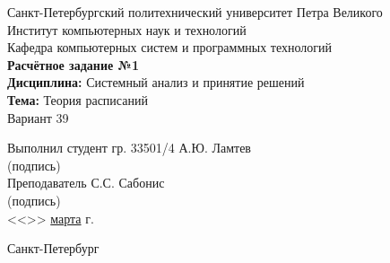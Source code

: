 \begin{titlepage}
\begin{center}
	Санкт-Петербургский политехнический университет Петра Великого\\[0.3cm]
	Институт компьютерных наук и технологий \\[0.3cm]
	Кафедра компьютерных систем и программных технологий\\[4cm]
	
	\textbf{Расчётное задание №1}\\[2mm]
	\textbf{Дисциплина:} Системный анализ и принятие решений\\[2mm]
	\textbf{Тема:} Теория расписаний\\[2mm]
	Вариант 39\\[6.5cm]
\end{center}

\begin{flushleft}
	\hspace*{5mm} Выполнил студент гр. 33501/4  \hspace*{3cm}\sign[3cm]\hspace*{2mm} А.Ю. Ламтев\\
	\hspace*{10.85cm} (подпись)\\[2.5mm]
	\hspace*{5mm} Преподаватель \hspace*{6.45cm}\sign[3cm]\hspace*{2mm} С.С. Сабонис\\
	\hspace*{10.85cm} (подпись)\\[2.5mm]
	\hspace*{11.1cm} <<\underline{\the\day}>> \underline{\hspace{5mm}марта\hspace{5mm}} \the\year\hspace{1mm} г.
\end{flushleft}

\vfill

\begin{center}
	Санкт-Петербург\\
	\the\year
\end{center}
\end{titlepage}
\addtocounter{page}{1}